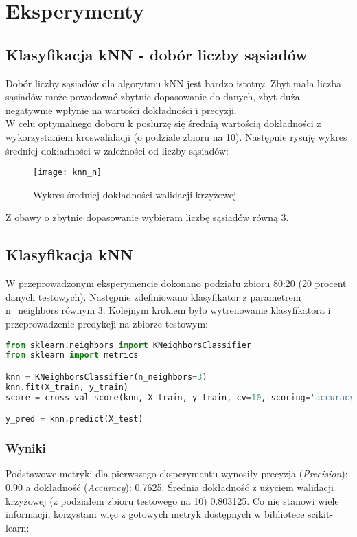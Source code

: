 \section{Eksperymenty}
\subsection{Klasyfikacja kNN - dobór liczby sąsiadów}
Dobór liczby sąsiadów dla algorytmu kNN jest bardzo istotny. Zbyt mała liczba sąsiadów może powodować zbytnie dopasowanie do danych, zbyt duża - negatywnie wpłynie na wartości dokładności i precyzji.\\

W celu optymalnego doboru k posłurzę się średnią wartością dokładności z wykorzystaniem kroswalidacji (o podziale zbioru na 10). Następnie rysuję wykres średniej dokładności w zależności od liczby sąsiadów:

\begin{figure}[H]
    \centering
    \texttt{[image: knn\_n]}
    \caption{Wykres średniej dokładności walidacji krzyżowej}
    \label{fig:knn_n}
\end{figure}

Z obawy o zbytnie dopasowanie wybieram liczbę sąsiadów równą 3.

\subsection{Klasyfikacja kNN }
W przeprowadzonym eksperymencie dokonano podziału zbioru 80:20 (20 procent danych testowych). Następnie zdefiniowano klasyfikator z parametrem n\_neighbors równym 3. Kolejnym krokiem było wytrenowanie klasyfikatora i przeprowadzenie predykcji na zbiorze testowym:\\

\begin{lstlisting}[language=Python, caption=Definicja i użycie kNN]
from sklearn.neighbors import KNeighborsClassifier
from sklearn import metrics

knn = KNeighborsClassifier(n_neighbors=3)
knn.fit(X_train, y_train)
score = cross_val_score(knn, X_train, y_train, cv=10, scoring='accuracy')

y_pred = knn.predict(X_test)
\end{lstlisting}

\subsubsection{Wyniki}
Podstawowe metryki dla pierwszego eksperymentu wynosiły precyzja (\textit{Precision}): 0.90 a dokładność (\textit{Accuracy}): 0.7625. Średnia dokładność z użyciem walidacji krzyżowej (z podziałem zbioru testowego na 10) 0.803125. Co nie stanowi wiele informacji, korzystam więc z gotowych metryk dostępnych w bibliotece scikit-learn:\\

